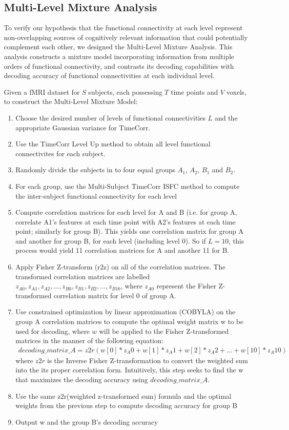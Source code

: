 \documentclass[11pt]{article}
\begin{document}
\subsection{Multi-Level Mixture Analysis}
To verify our hypothesis that the functional connectivity at each level represent non-overlapping sources of cognitively relevant information that could potentially complement each other, we designed the Multi-Level Mixture Analysis. This analysis constructs a mixture model incorporating information from multiple orders of functional connectivity, and contrasts its decoding capabilities with decoding accuracy of functional connectivities at each individual level.

Given a fMRI dataset for $S$ subjects, each possessing $T$ time points and $V$ voxels, to construct the Multi-Level Mixture Model:
\begin{enumerate}
\item Choose the desired number of levels of functional connectivities $L$ and the appropriate Gaussian variance for TimeCorr.
\item Use the TimeCorr Level Up method to obtain all level functional connectivites for each subject.
\item Randomly divide the subjects in to four equal groups $A_1$, $A_2$, $B_1$ and $B_2$.
\item For each group, use the Multi-Subject TimeCorr ISFC method to compute the inter-subject functional connectivity for each level
\item Compute correlation matrices for each level for A and B (i.e. for group A, correlate A1's features at each time point with A2's features at each time point; similarly for group B). This yields one correlation matrix for group A and another for group B, for each level (including level 0). So if $L=10$, this process would yield 11 correlation matrices for A and another 11 for B.
\item Apply Fisher Z-transform (r2z) on all of the correlation matrices. The transformed correlation matrices are labelled $z_{A0}, z_{A1}, z_{A2}, ..., z_{B0}, z_{B1}, z_{B2}, ..., z_{B10}$, where $z_{A0}$ represent the Fisher Z-transformed correlation matrix for level 0 of group A.
\item Use constrained optimization by linear approximation (COBYLA) on the group A correlation matrices to compute the optimal weight matrix w to be used for decoding, where $w$ will be applied to the Fisher Z-transformed matrices in the manner of the following equation:
\begin{align*}
decoding\_matrix\_A = z2r(w[0]*z_A0 + w[1]*z_A1 + w[2]*z_A2 + ... + w[10]*z_A10)
\end{align*}
where $z2r$ is the Inverse Fisher Z-transformation to convert the weighted sum into the its proper correlation form. Intuitively, this step seeks to find the w that maximizes the decoding accuracy using $decoding\_matrix\_A$.
\item Use the same z2r(weighted z-transformed sum) formula and the optimal weights from the previous step to compute decoding accuracy for group B
\item Output w and the group B's decoding accuracy
\end{enumerate}
\end{document}

